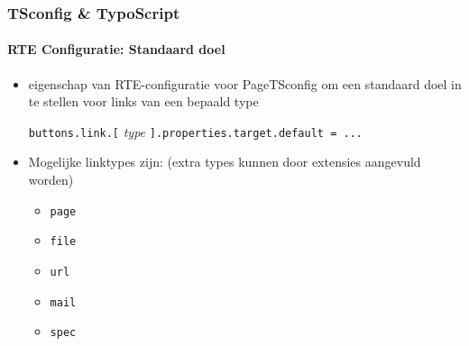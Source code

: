\begin{frame}[fragile]
	\frametitle{TSconfig \& TypoScript}
	\framesubtitle{RTE Configuratie: Standaard doel}

	\begin{itemize}

		\item eigenschap van RTE-configuratie voor PageTSconfig om een standaard doel in te
			stellen voor links van een bepaald type\newline

			\small
				\texttt{buttons.link.[}
				\textit{type}
				\texttt{].properties.target.default = ...}
			\normalsize\newline

		\item Mogelijke linktypes zijn:\newline
			\small
				(extra types kunnen door extensies aangevuld worden)
			\normalsize

			\begin{itemize}
				\item \texttt{page}
				\item \texttt{file}
				\item \texttt{url}
				\item \texttt{mail}
				\item \texttt{spec}
			\end{itemize}
	\end{itemize}

\end{frame}


